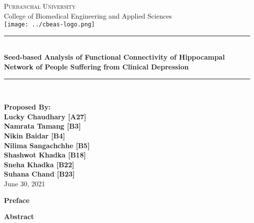\documentclass{article}
\newcommand{\HRule}{\rule{\linewidth}{0.1mm}}
\begin{document}
\begin{titlepage}
\begin{center}

  \textsc{\huge Purbanchal University}\\[1cm]
  {\huge College of Biomedical Engineering and Applied Sciences}\\[1cm]
  \texttt{[image: ../cbeas-logo.png]}\\[1cm]

  \color{red} \HRule \\[0.4cm] \color{black}
  {\huge \bfseries Seed-based Analysis of Functional Connectivity of
  Hippocampal Network of People Suffering from Clinical Depression}\\[0.2cm]
  \color{red} \HRule \\[2cm] \color{black}

\textbf{
  \Large Proposed By:\\[0.2cm]
\Large Lucky Chaudhary [A27]\\ Namrata Tamang [B3]\\ Nikin Baidar
  [B4]\\ Nilima Sangachchhe [B5]\\ Shashwot Khadka [B18]\\ Sneha
  Khadka [B22]\\Suhana Chand [B23]\\[1cm]}
\vfill
{\Large June 30, 2021}

\end{center}
\end{titlepage}

\clearpage
\setcounter{page}{1}

\begin{center}
 \textbf{\large Preface}
\end{center}
\newpage

\begin{center}
  \textbf{\large Abstract}
\end{center}
\end{document}

